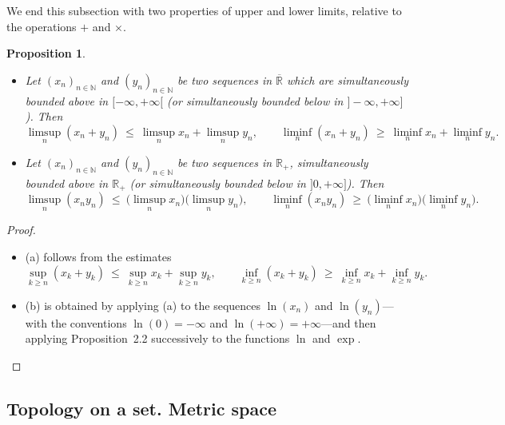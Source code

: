 \documentclass[12pt]{article}
\newtheorem{proposition}{Proposition}[section]
\theoremstyle{definition}
\begin{document}
We end this subsection with two properties of upper and lower limits, relative to the operations $+$ and $\times$.

\begin{proposition}
\begin{itemize}[leftmargin=1.5em]
\item[(a)] Let $(x_n)_{n\in\mathbb{N}}$ and $(y_n)_{n\in\mathbb{N}}$ be two sequences in $\overline{\mathbb{R}}$ which are simultaneously bounded above in $[-\infty,+\infty[$ (or simultaneously bounded below in $]-\infty,+\infty]$).
Then
\[
\limsup_{n}(x_n+y_n)\ \le\ \limsup_{n} x_n + \limsup_{n} y_n,
\qquad
\liminf_{n}(x_n+y_n)\ \ge\ \liminf_{n} x_n + \liminf_{n} y_n .
\]
\item[(b)] Let $(x_n)_{n\in\mathbb{N}}$ and $(y_n)_{n\in\mathbb{N}}$ be two sequences in $\mathbb{R}_+$, simultaneously bounded above in $\mathbb{R}_+$ (or simultaneously bounded below in $]0,+\infty]$).
Then
\[
\limsup_{n}(x_n y_n)\ \le\ \bigl(\limsup_{n} x_n\bigr)\bigl(\limsup_{n} y_n\bigr),
\qquad
\liminf_{n}(x_n y_n)\ \ge\ \bigl(\liminf_{n} x_n\bigr)\bigl(\liminf_{n} y_n\bigr).
\]
\end{itemize}
\end{proposition}

\begin{proof}
\begin{itemize}
\item (a) follows from the estimates
\[
\sup_{k\ge n}(x_k+y_k)\ \le\ \sup_{k\ge n} x_k + \sup_{k\ge n} y_k,
\qquad
\inf_{k\ge n}(x_k+y_k)\ \ge\ \inf_{k\ge n} x_k + \inf_{k\ge n} y_k.
\]

\item (b) is obtained by applying (a) to the sequences $\ln(x_n)$ and $\ln(y_n)$—with the conventions $\ln(0)=-\infty$ and $\ln(+\infty)=+\infty$—and then applying Proposition~2.2 successively to the functions $\ln$ and $\exp$.
\end{itemize}
\end{proof}

\subsection{Topology on a set. Metric space}\label{sec:2.3}
\end{document}
